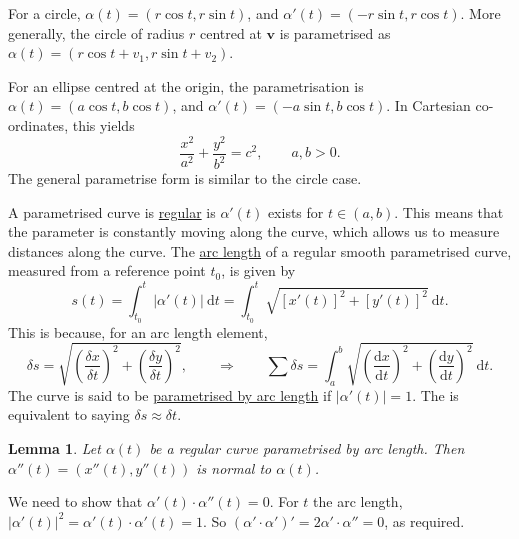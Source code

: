 \documentclass[10pt,notitlepage]{revtex4-1}
\newtheorem{lemma}[theorem]{Lemma}
\newenvironment{proof}[1][Proof]{\begin{trivlist}
\item[\hskip \labelsep {\bfseries #1}]}{\end{trivlist}}
\newenvironment{example}[1][Example]{\begin{trivlist}
\item[\hskip \labelsep {\bfseries #1}]}{\end{trivlist}}
\newcommand{\vb}{\boldsymbol{v}}
\begin{document}
\begin{example}
	For a circle, $\alpha(t)=(r\cos t,r\sin t)$, and $\alpha'(t)=(-r\sin t,r\cos
	t)$. More generally, the circle of radius $r$ centred at $\vb$ is
	parametrised as $\alpha(t)=(r\cos t + v_1, r\sin t + v_2)$.
	
	For an ellipse centred at the origin, the parametrisation is
	$\alpha(t)=(a\cos t, b\cos t)$, and $\alpha'(t)=(-a\sin t, b\cos t)$. In
	Cartesian co-ordinates, this yields
	\begin{equation}
		\frac{x^2}{a^2} + \frac{y^2}{b^2} = c^2,\qquad a,b>0.
	\end{equation}
	The general parametrise form is similar to the circle case.
\end{example}

A parametrised curve is \underline{regular} is $\alpha'(t)$ exists for
$t\in(a,b)$. This means that the parameter is constantly moving along the curve,
which allows us to measure distances along the curve. The \underline{arc length}
of a regular smooth parametrised curve, measured from a reference point $t_0$,
is given by
\begin{equation}
	s(t)=\int_{t_0}^t |\alpha'(t)|\ \mathrm{d}t = \int_{t_0}^{t}
	\sqrt{[x'(t)]^2+[y'(t)]^2}\ \mathrm{d}t.
\end{equation}
This is because, for an arc length element,
\begin{equation}
	\delta s=\sqrt{\left(\frac{\delta x}{\delta t}\right)^2 +
	\left(\frac{\delta y}{\delta t}\right)^2},\qquad\Rightarrow\qquad
	\sum\delta s=\int_a^b\sqrt{\left(\frac{\mathrm{d} x}{\mathrm{d} t}\right)^2 
	+\left(\frac{\mathrm{d} y}{\mathrm{d} t}\right)^2}\ \mathrm{d}t.
\end{equation}
The curve is said to be \underline{parametrised by arc length} if
$|\alpha'(t)|=1$. The is equivalent to saying $\delta s\approx\delta t$.

\begin{lemma}
	Let $\alpha(t)$ be a regular curve parametrised by arc length. Then
	$\alpha''(t)=(x''(t), y''(t))$ is normal to $\alpha(t)$.
\end{lemma}
\begin{proof}
	We need to show that $\alpha'(t)\cdot\alpha''(t)=0$. For $t$ the arc length,
	$|\alpha'(t)|^2=\alpha'(t)\cdot\alpha'(t)=1$. So
	$(\alpha'\cdot\alpha')'=2\alpha'\cdot\alpha''=0$, as required.
\end{proof}
\end{document}
